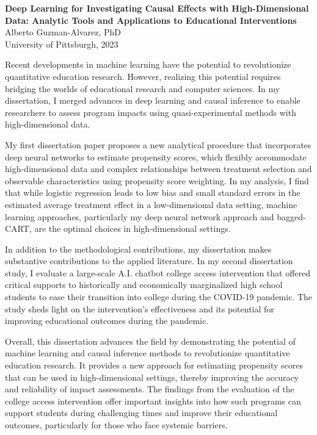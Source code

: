\pagestyle{plain}

\begin{center}

\textbf{Deep Learning for Investigating Causal Effects with High-Dimensional Data: Analytic Tools and Applications to Educational Interventions}\\
        Alberto Guzman-Alvarez, PhD\\
        University of Pittsburgh, 2023\\
    \end{center}
       \vspace*{3\baselineskip}

Recent developments in machine learning have the potential to revolutionize quantitative education research. However, realizing this potential requires bridging the worlds of educational research and computer sciences. In my dissertation, I merged advances in deep learning and causal inference to enable researchers to assess program impacts using quasi-experimental methods with high-dimensional data.

My first dissertation paper proposes a new analytical procedure that incorporates deep neural networks to estimate propensity scores, which flexibly accommodate high-dimensional data and complex relationships between treatment selection and observable characteristics using propensity score weighting. In my analysis, I find that while logistic regression leads to low bias and small standard errors in the estimated average treatment effect in a low-dimensional data setting, machine learning approaches, particularly my deep neural network approach and bagged-CART, are the optimal choices in high-dimensional settings.

In addition to the methodological contributions, my dissertation makes substantive contributions to the applied literature. In my second dissertation study, I evaluate a large-scale A.I. chatbot college access intervention that offered critical supports to historically and economically marginalized high school students to ease their transition into college during the COVID-19 pandemic. The study sheds light on the intervention's effectiveness and its potential for improving educational outcomes during the pandemic.

Overall, this dissertation advances the field by demonstrating the potential of machine learning and causal inference methods to revolutionize quantitative education research. It provides a new approach for estimating propensity scores that can be used in high-dimensional settings, thereby improving the accuracy and reliability of impact assessments. The findings from the evaluation of the college access intervention offer important insights into how such programs can support students during challenging times and improve their educational outcomes, particularly for those who face systemic barriers.

\newpage